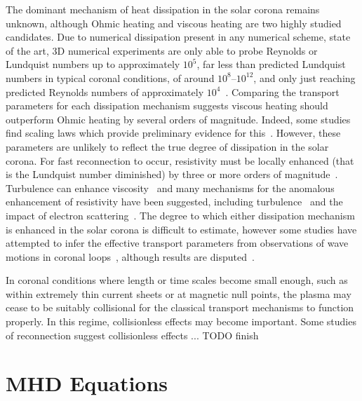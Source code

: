 The dominant mechanism of heat dissipation in the solar corona remains unknown, although Ohmic heating and viscous heating are two highly studied candidates. Due to numerical dissipation present in any numerical scheme, state of the art, 3D numerical experiments are only able to probe Reynolds or Lundquist numbers up to approximately $10^5$, far less than predicted Lundquist numbers in typical coronal conditions, of around $10^8$--$10^{12}$, and only just reaching predicted Reynolds numbers of approximately $10^4$~\cite{craigAnisotropicViscousDissipation2009a,hollwegViscosityMagnetizedPlasma1985}. Comparing the transport parameters for each dissipation mechanism suggests viscous heating should outperform Ohmic heating by several orders of magnitude. Indeed, some studies find scaling laws which provide preliminary evidence for this~\cite{craigAnisotropicViscousDissipation2009a,craigViscousDissipation3D2013}. However, these parameters are unlikely to reflect the true degree of dissipation in the solar corona. For fast reconnection to occur, resistivity must be locally enhanced (that is the Lundquist number diminished) by three or more orders of magnitude~\cite{parkerReconnectionRateMagnetic1973,biskampNonlinearMagnetohydrodynamics1993}. Turbulence can enhance viscosity~\cite{canutoTurbulentViscosity1988} and many mechanisms for the anomalous enhancement of resistivity have been suggested, including turbulence~\cite{cheHowAnomalousResistivity2017} and the impact of electron scattering~\cite{maEffectiveResistivityCollisionless2018}. The degree to which either dissipation mechanism is enhanced in the solar corona is difficult to estimate, however some studies have attempted to infer the effective transport parameters from observations of wave motions in coronal loops~\cite{nakariakovTRACEObservationDamped1999}, although results are disputed~\cite{klimchukCoronalSeismologyPropagation2004}. 

In coronal conditions where length or time scales become small enough, such as within extremely thin current sheets or at magnetic null points, the plasma may cease to be suitably collisional for the classical transport mechanisms to function properly. In this regime, collisionless effects may become important. Some studies of reconnection suggest collisionless effects ... TODO finish

\section{MHD Equations}

